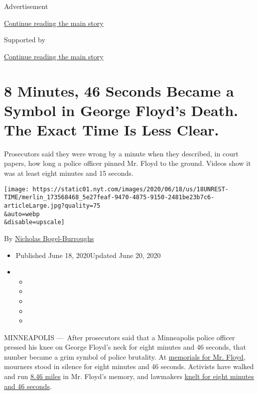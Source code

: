 Advertisement

\protect\hyperlink{after-top}{Continue reading the main story}

Supported by

\protect\hyperlink{after-sponsor}{Continue reading the main story}

\hypertarget{8-minutes-46-seconds-became-a-symbol-in-george-floyds-death-the-exact-time-is-less-clear}{%
\section{8 Minutes, 46 Seconds Became a Symbol in George Floyd's Death.
The Exact Time Is Less
Clear.}\label{8-minutes-46-seconds-became-a-symbol-in-george-floyds-death-the-exact-time-is-less-clear}}

Prosecutors said they were wrong by a minute when they described, in
court papers, how long a police officer pinned Mr. Floyd to the ground.
Videos show it was at least eight minutes and 15 seconds.

\texttt{[image: https://static01.nyt.com/images/2020/06/18/us/18UNREST-TIME/merlin\_173568468\_5e27feaf-9470-4875-9150-2481be23b7c6-articleLarge.jpg?quality=75\\\&auto=webp\\\&disable=upscale]}

By \href{https://www.nytimes.com/by/nicholas-bogel-burroughs}{Nicholas
Bogel-Burroughs}

\begin{itemize}
\item
  Published June 18, 2020Updated June 20, 2020
\item
  \begin{itemize}
  \item
  \item
  \item
  \item
  \item
  \end{itemize}
\end{itemize}

MINNEAPOLIS ---~After prosecutors said that a Minneapolis police officer
pressed his knee on George Floyd's neck for eight minutes and 46
seconds, that number became a grim symbol of police brutality. At
\href{https://www.nytimes.com/2020/06/04/us/floyd-memorial-funeral.html}{memorials
for Mr. Floyd}, mourners stood in silence for eight minutes and 46
seconds. Activists have walked and run
\href{https://www.vfpress.news/articles/communities/an-8-46-mile-george-floyd-justice-walk-recognizes-martyrs-suffering/}{8.46
miles} in Mr. Floyd's memory, and lawmakers
\href{https://www.pbs.org/newshour/nation/watch-congressional-democrats-hold-moment-of-silence-to-honor-george-floyd}{knelt
for eight minutes and 46 seconds}.

